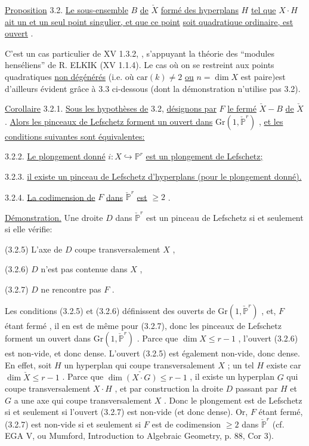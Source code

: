 \underline{Proposition} 3.2. \underline{Le sous-ensemble} $B$ \underline{de} $\check{X}$ \underline{formé des hyperplans} $H$ \underline{tel que} $X \cdot H$ \underline{ait un et un seul point singulier, et que ce point}
\underline{soit quadratique ordinaire, est ouvert} .

C'est un cas particulier de XV 1.3.2, , s'appuyant la théorie des ``modules henséliens'' de R. ELKIK (XV 1.1.4). Le cas où on se restreint aux points quadratiques \underline{non dégénérés} (i.e. où $\mathrm{car}(k) \neq 2$ \underline{ou} $n=\dim X$ est paire)est d'ailleurs évident grâce à 3.3 ci-dessous (dont la démonstration n'utilise pas 3.2).

\underline{Corollaire} 3.2.1. \underline{Sous les hypothèses de} 3.2, \underline{désignons par} $F$ \underline{le fermé} $\check{X}-B$ \underline{de} $\check{X}$ . \underline{Alors les pinceaux de Lefschetz forment un ouvert dans} $\mathrm{Gr}(1, \check{\mathbb{P}}^r)$ , \underline{et les conditions suivantes sont équivalentes:}

3.2.2. \underline{Le plongement donné} $i : X \hookrightarrow \mathbb{P}^r$ \underline{est un plongement de Lefschetz;}

3.2.3. \underline{il existe un pinceau de Lefschetz d'hyperplans (pour le plongement donné).}

3.2.4. \underline{La codimension de} $F$ \underline{dans} $\check{\mathbb{P}}^r$ \underline{est} $\geq 2$ .

\underline{Démonstration.} Une droite $D$ dans $\check{\mathbb{P}}^r$ est un pinceau de Lefschetz si et seulement si elle vérifie:

(3.2.5) L'axe de $D$ coupe transversalement $X$ ,

(3.2.6) $D$ n'est pas contenue dans $X$ ,

(3.2.7) $D$ ne rencontre pas $F$ .



Les conditions (3.2.5) et (3.2.6) définissent des ouverts de $\mathrm{Gr}(1, \check{\mathbb{P}}^{r})$ , et, $F$ étant fermé , il en est de même pour (3.2.7), donc les pinceaux de Lefschetz forment un ouvert dans $\mathrm{Gr}(1, \check{\mathbb{P}}^{r})$ . Parce que $\dim X \leq r-1$ , l'ouvert (3.2.6) est non-vide, et donc dense. L'ouvert (3.2.5) est également non-vide, donc dense. En effet, soit $H$ un hyperplan qui coupe transversalement $X$ ; un tel $H$ existe car $\dim \check{X} \leq r-1$ . Parce que $\dim \check{(X \cdot G)} \leq r-1$ , il existe un hyperplan $G$ qui coupe transversalement $X \cdot H$ , et par construction la droite $D$ passant par $H$ et $G$ a une axe qui coupe transversalement $X$ . Donc le plongement est de Lefschetz si et seulement si l'ouvert (3.2.7) est non-vide (et donc dense). Or, $F$ étant fermé, (3.2.7) est non-vide si et seulement si $F$ est de codimension $\geq 2$ dans $\check{\mathbb{P}}^{r}$ (cf. EGA V, ou Mumford, Introduction to Algebraic Geometry, p. 88, Cor 3).

